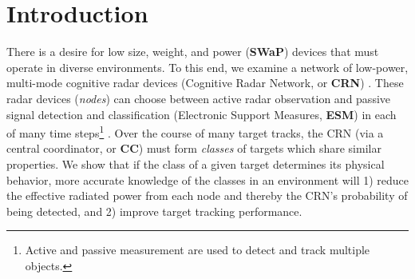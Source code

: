 \documentclass[journal,12pt,onecolumn,draftclsnofoot,]{IEEEtran}
\theoremstyle{definition}
\begin{document}

\section{Introduction}
\label{sec:intro}
There is a desire for low size, weight, and power (\textbf{SWaP}) devices that must operate in diverse environments. 
To this end, we examine a network of low-power, multi-mode cognitive radar devices (Cognitive Radar Network, or \textbf{CRN}) \cite{howard2022_MMABjournal} \cite{haykin2005}. 
These radar devices (\emph{nodes}) \cite{thornton2022_universaljournal} can choose between active radar observation and passive signal detection and classification (Electronic Support Measures, \textbf{ESM}) in each of many time steps\footnote{Active and passive measurement are used to detect and track multiple objects. } \cite{Bogler1987}. 
Over the course of many target tracks, the CRN (via a central coordinator, or \textbf{CC}) must form \emph{classes} of targets which share similar properties. 
We show that if the class of a given target determines its physical behavior, more accurate knowledge of the classes in an environment will 1) reduce the effective radiated power from each node and thereby the CRN's probability of being detected, and 2) improve target tracking performance. 
\end{document}
